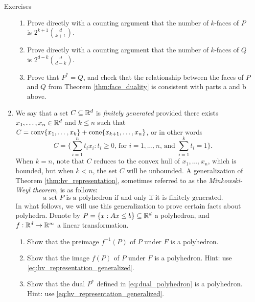 \begin{xcb}{Exercises}
\begin{enumerate}[label=\thechapter.\arabic*]
\begin{enumerate}[label=\alph*.]
\item Prove directly with a counting argument that the number of $k$-faces of
  $P$ is $2^{k+1} {d \choose k+1}$.  

\item Prove directly with a counting argument that the number of $k$-faces of
  $Q$ is $2^{d-k} {d \choose d-k}$. 

\item Prove that $P^* = Q$, and check that the relationship between the faces of
  $P$ and $Q$ from Theorem \ref{thm:face_duality} is consistent with parts a and
  b above. 
\end{enumerate}

\item \label{ex:minkowski_weyl}
  We say that a set $C \subseteq \mathbb{R}^d$ is \emph{finitely generated} provided
  there exists $x_1,\dots,x_n \in \mathbb{R}^d$ and $k \leq n$ such that $C = 
  \operatorname{conv}\{x_1,\dots,x_k\} + \operatorname{cone}\{x_{k+1},\dots,x_n\}$, or in other words  
  \[
  C = \bigg\{
  \sum_{i=1}^n t_i x_i : \text{$t_i \geq 0$, for $i=1,\dots,n$, and
    $\sum_{i=1}^k t_i = 1$} \bigg\}.  
  \]
  When $k = n$, note that $C$ reduces to the convex hull of $x_1,\dots,x_n$,
  which is bounded, but when $k < n$, the set $C$ will be unbounded. A 
  generalization of Theorem \ref{thm:hv_representation}, sometimes referred to
  as the \emph{Minkowski-Weyl theorem}, is as follows: 
  \begin{equation}
  \label{eq:hv_representation_generalized}
  \text{a set $P$ is a polyhedron if and only if it is finitely generated.}
  \end{equation}
  In what follows, we will use this generalization to prove certain facts about
  polyhedra. Denote by $P = \{x : Ax \leq b\} \subseteq \mathbb{R}^d$ a polyhedron, and
  $f : \mathbb{R}^d \to \mathbb{R}^m$ a linear transformation.     

\begin{enumerate}[label=\alph*.]
\item Show that the preimage $f^{-1}(P)$ of $P$ under $F$ is a polyhedron. 

\item Show that the image $f(P)$ of $P$ under $F$ is a polyhedron. Hint: use
  \eqref{eq:hv_representation_generalized}. 

\item Show that the dual $P^*$ defined in \eqref{eq:dual_polyhedron} is a 
  polyhedron. Hint: use \eqref{eq:hv_representation_generalized}.
\end{enumerate}


\end{enumerate}
\end{xcb}
